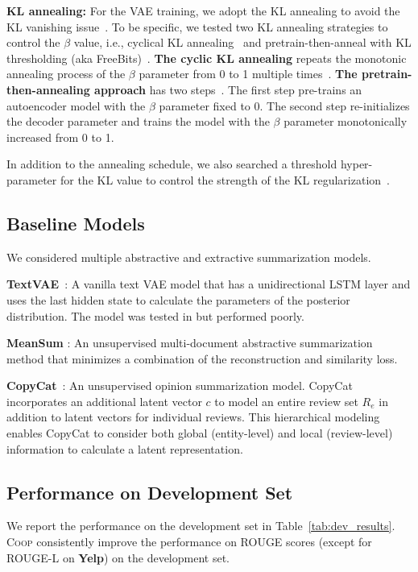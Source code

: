 \documentclass[11pt]{article}
\newcommand{\aggname}{\textsc{Coop}}
\newcommand{\vaeorig}{TextVAE}
\newcommand{\yelp}{\mbox{\bf Yelp}}
\begin{document}
\noindent
{\bf KL annealing:}
For the VAE training, we adopt the KL annealing to avoid the KL vanishing issue~\cite{bowman-etal-2016-generating}.
To be specific, we tested two KL annealing strategies to control the $\beta$ value, i.e., cyclical KL annealing~\cite{fu-etal-2019-cyclical} and pretrain-then-anneal with KL thresholding (aka FreeBits)~\cite{kingma2016improved,li-etal-2019-surprisingly}.
{\bf The cyclic KL annealing} repeats the monotonic annealing process of the $\beta$ parameter from 0 to 1 multiple times~\cite{fu-etal-2019-cyclical}.
{\bf The pretrain-then-annealing approach} has two steps~\cite{li-etal-2019-surprisingly}. The first step pre-trains an autoencoder model with the $\beta$ parameter fixed to 0.
The second step re-initializes the decoder parameter and trains the model with the $\beta$ parameter monotonically increased from 0 to 1.

In addition to the annealing schedule, we also searched a threshold hyper-parameter for the KL value to control the strength of the KL regularization~\cite{kingma2016improved}.

\subsection{Baseline Models}
\label{app:baselines}
We considered multiple abstractive and extractive summarization models. 

\noindent
{\bf \vaeorig}~\cite{bowman-etal-2016-generating}: A vanilla text VAE model that has a unidirectional LSTM layer and uses the last hidden state to calculate the parameters of the posterior distribution. The model was tested in \citet{brazinskas-etal-2020-unsupervised} but performed poorly.

\noindent
{\bf MeanSum} \cite{Chu:2019:MeanSum}: An unsupervised multi-document abstractive summarization method that minimizes a combination of the reconstruction and similarity loss.

\noindent
{\bf CopyCat}~\cite{brazinskas-etal-2020-unsupervised}: An unsupervised opinion summarization model. CopyCat incorporates an additional latent vector $c$ to model an entire review set $R_e$ in addition to latent vectors for individual reviews.
This hierarchical modeling enables CopyCat to consider both global (entity-level) and local (review-level) information to calculate a latent representation.

\subsection{Performance on Development Set}
We report the performance on the development set in Table~\ref{tab:dev_results}.
\aggname{} consistently improve the performance on ROUGE scores (except for ROUGE-L on \yelp) on the development set.
\end{document}
